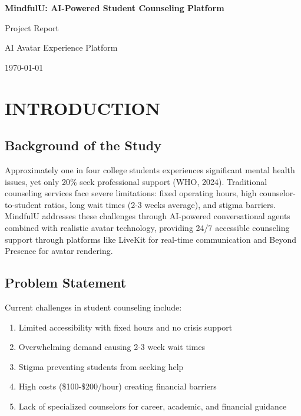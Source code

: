 \documentclass[11pt,a4paper]{report}
\begin{document}
\begin{titlepage}
    \centering
    \vspace*{1.5cm}
    {\LARGE\bfseries MindfulU: AI-Powered Student Counseling Platform\par}
    \vspace{0.5cm}
    {\Large Project Report\par}
    \vspace{1cm}
    {\large AI Avatar Experience Platform\par}
    \vfill
    {\large \today\par}
\end{titlepage}

\chapter{INTRODUCTION}

\section{Background of the Study}
Approximately one in four college students experiences significant mental health issues, yet only 20\% seek professional support (WHO, 2024). Traditional counseling services face severe limitations: fixed operating hours, high counselor-to-student ratios, long wait times (2-3 weeks average), and stigma barriers. MindfulU addresses these challenges through AI-powered conversational agents combined with realistic avatar technology, providing 24/7 accessible counseling support through platforms like LiveKit for real-time communication and Beyond Presence for avatar rendering.

\section{Problem Statement}
Current challenges in student counseling include: 
\begin{enumerate}
    \item Limited accessibility with fixed hours and no crisis support
    \item Overwhelming demand causing 2-3 week wait times
    \item Stigma preventing students from seeking help
    \item High costs (\$100-\$200/hour) creating financial barriers
    \item Lack of specialized counselors for career, academic, and financial guidance
\end{enumerate}
\end{document}
